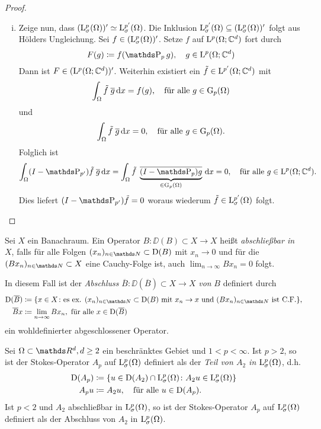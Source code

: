 \begin{proof}
\begin{enumerate}[(i)]
\item Zeige nun, dass $(\mathrm{L}_\sigma^{p}(\Omega))' \simeq \mathrm{L}^{p'}_\sigma(\Omega)$.
  Die Inklusion $\mathrm{L}_\sigma^{p'}(\Omega) \subseteq (\mathrm{L}_\sigma^p(\Omega))'$ folgt aus Hölders Ungleichung.
  Sei $f \in (\mathrm{L}_\sigma^p(\Omega))'$.
  Setze $f$ auf $\mathrm{L}^p(\Omega; \mathbb{C}^d)$ fort durch
  $$
  F(g) \coloneqq f(\PP_p g), \quad g \in \Ell^p(\Omega; \C^d)
  $$
  Dann ist $F \in (\mathrm{L}^p(\Omega; \mathbb{C}^d))'$. Weiterhin existiert ein $\tilde f \in \mathrm{L}^{p'}(\Omega; \mathbb{C}^d)$ mit 
  $$
  \int_\Omega \tilde f \; \overline g \, {\operatorname{d}\!{x}} = f(g), \quad\text{für alle } g \in \mathrm{G}_p(\Omega)
  $$
  und
  $$
  \int_\Omega \tilde f \; \overline g \, {\operatorname{d}\!{x}} = 0, \quad\text{für alle } g \in \mathrm{G}_p(\Omega).
  $$
  Folglich ist
  $$
  \int_\Omega (I - \PP_{p'} ) \tilde f \; \overline g \d x 
  = \int_\Omega \tilde f \; \underbrace{\overline{(I - \PP_p)g}}_{\in \GG_p(\Omega)} \d x
  = 0, \quad\text{für alle } g \in \Ell^p(\Omega; \C^d).
  $$
  Dies liefert $(I - \PP_{p'}) \tilde f = 0$ woraus wiederum $\tilde f \in \mathrm{L}_\sigma^{p'}(\Omega)$ folgt.
  \end{enumerate}
\end{proof}

\begin{defn}
  Sei $X$ ein Banachraum.
  Ein Operator $B \colon \DD(B) \subset X \to X$ heißt \emph{abschließbar in} $X$, falls für alle Folgen $(x_n)_{n \in \N} \subset \DD(B)$ mit $x_n \to 0$ und für die $(B x_n)_{n \in \N} \subset X$ eine Cauchy-Folge ist, auch $\lim_{n \to \infty} B x_n = 0$ folgt.

  In diesem Fall ist der \emph{Abschluss} $\overline B \colon \DD(\overline B) \subset X \to X$ \emph{von} $B$ definiert durch
  \begin{align*}
  \DD(\overline B) &\coloneqq \{ x \in X \colon \text{es ex. } (x_n)_{n \in \N} \subset \DD(B) \text{ mit } x_n \to x \text{ und } (B x_n)_{n \in \N} \text{ ist C.F.} \}, \\
  \overline B x &\coloneqq \lim_{n \to \infty} B x_n, \text{ für alle } x \in \DD(\overline B)
\end{align*}
ein wohldefinierter abgeschlossener Operator.
\end{defn}

\begin{defn}
  Sei $\Omega \subset \R^d, d \geq 2$ ein beschränktes Gebiet und $1 < p < \infty$.
  Ist $p > 2$, so ist der Stokes-Operator $A_p$ auf $\mathrm{L}_\sigma^p(\Omega)$ definiert als der \emph{Teil von $A_2$ in $\mathrm{L}^p_\sigma(\Omega)$}, d.h.
  \begin{align*}
    \mathrm{D}(A_p) &\coloneqq \{ u \in \mathrm{D}(A_2) \cap \mathrm{L}_\sigma^p(\Omega) \colon A_2 u \in \mathrm{L}_\sigma^p(\Omega) \} \\
    A_p u &\coloneqq A_2 u, \quad\text{für alle } u \in \mathrm{D}(A_p).
  \end{align*}
  Ist $p < 2$ und $A_2$ abschließbar in $\mathrm{L}_\sigma^p(\Omega)$, so ist der Stokes-Operator $A_p$ auf $\mathrm{L}_\sigma^p(\Omega)$ definiert als der Abschluss von $A_2$ in $\mathrm{L}_\sigma^p(\Omega)$.
\end{defn}

